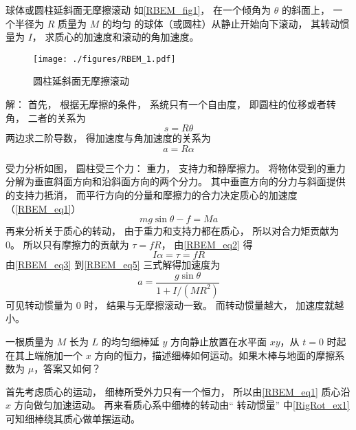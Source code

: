 \begin{example}{球体或圆柱延斜面无摩擦滚动}\label{RBEM_ex1}
如\autoref{RBEM_fig1}， 在一个倾角为 $\theta$ 的斜面上， 一个半径为 $R$ 质量为 $M$ 的均匀 的球体（或圆柱）从静止开始向下滚动， 其转动惯量为 $I$， 求质心的加速度和滚动的角加速度。

\begin{figure}[ht]
\centering
\texttt{[image: ./figures/RBEM\_1.pdf]}
\caption{圆柱延斜面无摩擦滚动} \label{RBEM_fig1}
\end{figure}

解： 首先， 根据无摩擦的条件， 系统只有一个自由度， 即圆柱的位移或者转角， 二者的关系为
\begin{equation}
s = R\theta
\end{equation}
两边求二阶导数， 得加速度与角加速度的关系为
\begin{equation}\label{RBEM_eq3}
a = R\alpha
\end{equation}

受力分析如图， 圆柱受三个力： 重力， 支持力和静摩擦力。 将物体受到的重力分解为垂直斜面方向和沿斜面方向的两个分力。 其中垂直方向的分力与斜面提供的支持力抵消， 而平行方向的分量和摩擦力的合力决定质心的加速度（\autoref{RBEM_eq1}）
\begin{equation}\label{RBEM_eq4}
mg\sin\theta - f = Ma
\end{equation}
再来分析关于质心的转动， 由于重力和支持力都在质心， 所以对合力矩贡献为 0。 所以只有摩擦力的贡献为 $\tau = fR$， 由\autoref{RBEM_eq2} 得
\begin{equation}\label{RBEM_eq5}
I\alpha = \tau = f R
\end{equation}
由\autoref{RBEM_eq3} 到\autoref{RBEM_eq5} 三式解得加速度为
\begin{equation}
a = \frac{g \sin\theta}{1 + I/(MR^2)}
\end{equation}
可见转动惯量为 0 时， 结果与无摩擦滚动一致。 而转动惯量越大， 加速度就越小。
\end{example}

\begin{example}{}
一根质量为 $M$ 长为 $L$ 的均匀细棒延 $y$ 方向静止放置在水平面 $xy$，从 $t=0$ 时起在其上端施加一个 $x$ 方向的恒力，描述细棒如何运动。如果木棒与地面的摩擦系数为 $\mu$，答案又如何？

首先考虑质心的运动， 细棒所受外力只有一个恒力， 所以由\autoref{RBEM_eq1} 质心沿 $x$ 方向做匀加速运动。 再来看质心系中细棒的转动由“ 转动惯量” 中\autoref{RigRot_ex1} 可知细棒绕其质心做单摆运动。
\end{example}

